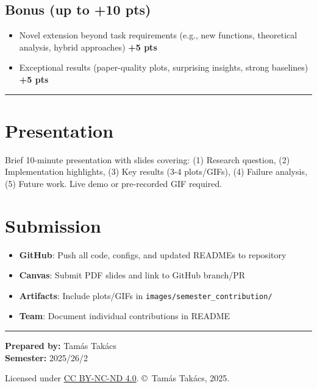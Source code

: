 \documentclass[11pt,a4paper]{scrartcl}
\newcommand{\codepath}[1]{\colorbox{codehighlight}{\texttt{#1}}}
\newcommand{\sectiondivider}{%
  \vspace{0.2em}%
  \noindent\textcolor{rulecolor}{\rule{0.3\textwidth}{0.4pt}}%
  \vspace{0.3em}%
}
\begin{document}
\subsection*{Bonus (up to +10 pts)}
\begin{itemize}
    \item Novel extension beyond task requirements (e.g., new functions, theoretical analysis, hybrid approaches) \dotfill \textbf{+5 pts}
    \item Exceptional results (paper-quality plots, surprising insights, strong baselines) \dotfill \textbf{+5 pts}
\end{itemize}

\sectiondivider

\section*{Presentation}

Brief 10-minute presentation with slides covering: (1) Research question, (2) Implementation highlights, (3) Key results (3-4 plots/GIFs), (4) Failure analysis, (5) Future work. Live demo or pre-recorded GIF required.

\section*{Submission}

\begin{tcolorbox}[modern]
\begin{itemize}
    \item \textbf{GitHub}: Push all code, configs, and updated READMEs to repository
    \item \textbf{Canvas}: Submit PDF slides and link to GitHub branch/PR
    \item \textbf{Artifacts}: Include plots/GIFs in \codepath{images/semester\_contribution/}
    \item \textbf{Team}: Document individual contributions in README
\end{itemize}
\end{tcolorbox}

\vspace{2em}

\noindent\rule{\textwidth}{0.5pt}

\vspace{0.5em}
\noindent\textbf{Prepared by:} Tamás Takács \\
\textbf{Semester:} 2025/26/2

\vspace{1em}
\begin{center}
    \footnotesize\color{accentcolor} Licensed under \href{https://creativecommons.org/licenses/by-nc-nd/4.0/}{CC BY-NC-ND 4.0}. \copyright~Tamás Takács, 2025.
\end{center}
 
\end{document}
